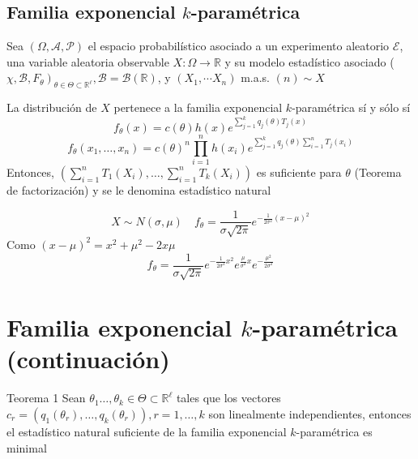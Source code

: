 \subsection*{Familia exponencial $k$-paramétrica}

\begin{definición}
Sea $(\Omega, \mathcal{A}, \mathcal{P})$ el espacio probabilístico asociado a un experimento aleatorio $\mathcal{E}$, una variable aleatoria observable $X: \Omega \longrightarrow \mathbb{R}$ y su modelo estadístico asociado ( $\left.\chi, \mathcal{B}, F_{\theta}\right)_{\theta \in \Theta \subset \mathbb{R}^{\ell}}, \mathcal{B}=\mathcal{B}(\mathbb{R})$, y $\left(X_{1}, \cdots X_{n}\right)$ m.a.s. $(n) \sim X$

La distribución de $X$ pertenece a la familia exponencial $k$-paramétrica sí y sólo sí
\[f_{\theta}(x)=c(\theta) h(x) e^{\sum_{j=1}^{k} q_{j}(\theta) T_{j}(x)}\]
\[f_{\theta}\left(x_{1}, \ldots, x_{n}\right)=c(\theta)^{n} \prod_{i=1}^{n} h\left(x_{i}\right) e^{\sum_{j=1}^{k} q_{j}(\theta) \sum_{i=1}^{n} T_{j}\left(x_{i}\right)}\]
Entonces, $\left(\sum_{i=1}^{n} T_{1}\left(X_{i}\right), \ldots, \sum_{i=1}^{n} T_{k}\left(X_{i}\right)\right)$ es suficiente para $\theta$ (Teorema de factorización) y se le denomina estadístico natural
\end{definición}

\[X \sim N(\sigma, \mu) \quad f_\theta = \frac{1}{\sigma \sqrt{2\pi}}e^{-\frac{1}{2\sigma^2}(x - \mu)^2}\]
Como $(x- \mu)^2 = x^2 + \mu^2 -2x\mu$\\
\[f_\theta = \frac{1}{\sigma \sqrt{2\pi}}e^{-\frac{1}{2\sigma^2}x^2}e^{\frac{\mu}{\sigma^2}x}e^{-\frac{\mu^2}{2\sigma^2}}\]

\section*{Familia exponencial $k$-paramétrica (continuación)}
Teorema 1 Sean $\theta_{1} \ldots, \theta_{k} \in \Theta \subset \mathbb{R}^{\ell}$ tales que los vectores $c_{r}=\left(q_{1}\left(\theta_{r}\right), \ldots, q_{k}\left(\theta_{r}\right)\right), r=1, \ldots, k$ son linealmente independientes, entonces el estadístico natural suficiente de la familia exponencial $k$-paramétrica es minimal

